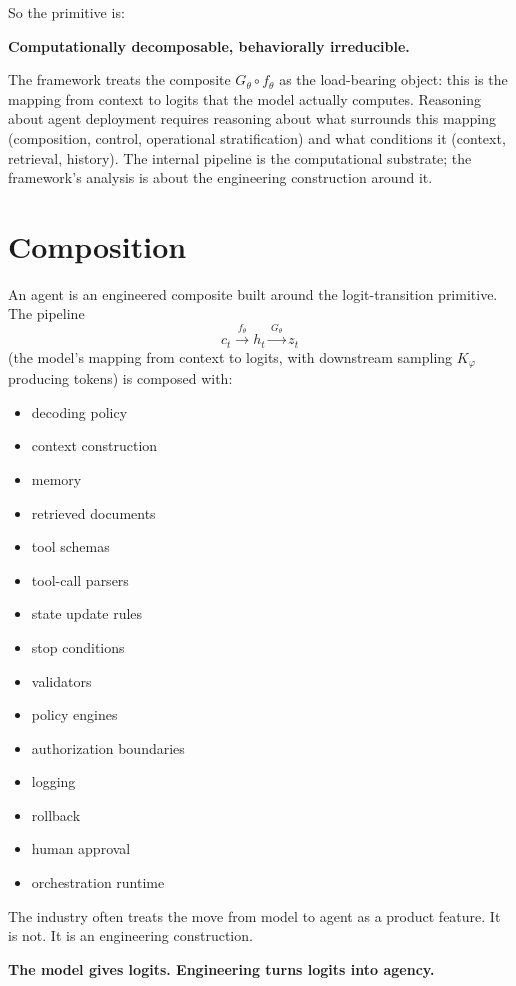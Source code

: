 \documentclass[11pt]{article}
\begin{document}
So the primitive is:

\begin{pullquote}
\textbf{Computationally decomposable, behaviorally irreducible.}
\end{pullquote}

The framework treats the composite $G_\theta \circ f_\theta$ as the load-bearing object: this is the mapping from context to logits that the model actually computes. Reasoning about agent deployment requires reasoning about what surrounds this mapping (composition, control, operational stratification) and what conditions it (context, retrieval, history). The internal pipeline is the computational substrate; the framework's analysis is about the engineering construction around it.

\section{Composition}

An agent is an engineered composite built around the logit-transition primitive. The pipeline
\[
c_t \xrightarrow{\,f_\theta\,} h_t \xrightarrow{\,G_\theta\,} z_t
\]
(the model's mapping from context to logits, with downstream sampling $K_\varphi$ producing tokens) is composed with:

\begin{itemize}
\item decoding policy
\item context construction
\item memory
\item retrieved documents
\item tool schemas
\item tool-call parsers
\item state update rules
\item stop conditions
\item validators
\item policy engines
\item authorization boundaries
\item logging
\item rollback
\item human approval
\item orchestration runtime
\end{itemize}

The industry often treats the move from model to agent as a product feature. It is not. It is an engineering construction.

\begin{pullquote}
\textbf{The model gives logits. Engineering turns logits into agency.}
\end{pullquote}
\end{document}
